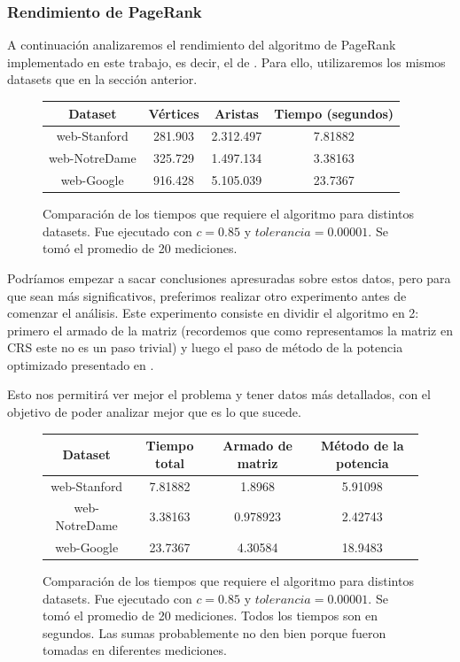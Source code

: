 \subsubsection{Rendimiento de PageRank}
A continuación analizaremos el rendimiento del algoritmo de PageRank implementado en este trabajo, es decir, el de \cite{Kamvar2003}. Para ello, utilizaremos los mismos datasets que en la sección anterior.

\begin{figure}[H]
\centering
\begin{tabular}{| c | c | c | c |}
  \hline
  Dataset & Vértices & Aristas & Tiempo (segundos) \\ \hline \hline
  web-Stanford & 281.903 & 2.312.497 & 7.81882 \\ \hline
  web-NotreDame & 325.729 & 1.497.134 & 3.38163 \\ \hline
  web-Google & 916.428 & 5.105.039 & 23.7367 \\ \hline
\end{tabular}

  \caption{\footnotesize{Comparación de los tiempos que requiere el algoritmo para distintos datasets. Fue ejecutado con $c = 0.85$ y $tolerancia = 0.00001$.  Se tomó el promedio de 20 mediciones.}}
  \label{fig:tiempos1}
\end{figure}

Podríamos empezar a sacar conclusiones apresuradas sobre estos datos, pero para que sean más significativos, preferimos realizar otro experimento antes de comenzar el análisis.
Este experimento consiste en dividir el algoritmo en 2: primero el armado de la matriz (recordemos que como representamos la matriz en CRS este no es un paso trivial) y luego el paso de método de la potencia optimizado presentado en \cite{Kamvar2003}.

Esto nos permitirá ver mejor el problema y tener datos más detallados, con el objetivo de poder analizar mejor que es lo que sucede.

\begin{figure}[H]
\centering
\begin{tabular}{| c | c | c | c |}
  \hline
  Dataset & Tiempo total & Armado de matriz & Método de la potencia \\ \hline \hline
  web-Stanford & 7.81882 & 1.8968 & 5.91098 \\ \hline
  web-NotreDame &  3.38163 & 0.978923 & 2.42743 \\ \hline
  web-Google & 23.7367 & 4.30584 & 18.9483 \\ \hline
\end{tabular}

  \caption{\footnotesize{Comparación de los tiempos que requiere el algoritmo para distintos datasets. Fue ejecutado con $c = 0.85$ y $tolerancia = 0.00001$. Se tomó el promedio de 20 mediciones. Todos los tiempos son en segundos. Las sumas probablemente no den bien porque fueron tomadas en diferentes mediciones. }}
  \label{fig:tiempos2}
\end{figure}


